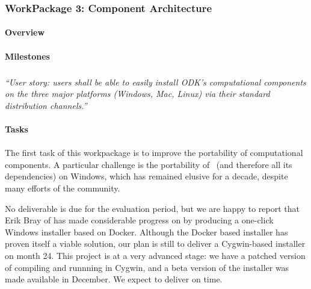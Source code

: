   \subsubsection{WorkPackage 3:  Component Architecture}


\paragraph{Overview}

\paragraph{Milestones}

\subparagraph{}

\emph{“User story: users shall be able to easily install ODK's
    computational components on the three major platforms (Windows,
    Mac, Linux) via their standard distribution channels.”}

\paragraph{Tasks}

  \paragraph{}
  \label{component-architecture@portability}
  The first task of this workpackage is to improve the portability of
  computational components. A particular challenge is the portability
  of \Sage\ (and therefore all its dependencies) on Windows, which has
  remained elusive for a decade, despite many efforts of the
  community.

  No deliverable is due for the evaluation period, but we are happy to
  report that Erik Bray of  has made considerable progress on
   by producing a
  one-click Windows installer based on Docker. Although the Docker
  based installer has proven itself a viable solution, our plan is
  still to deliver a Cygwin-based installer on month 24. This project
  is at a very advanced stage: we have a patched version of \Sage
  compiling and runnning in Cygwin, and a beta version of the
  installer was made available in December. We expect to deliver
   on time.

